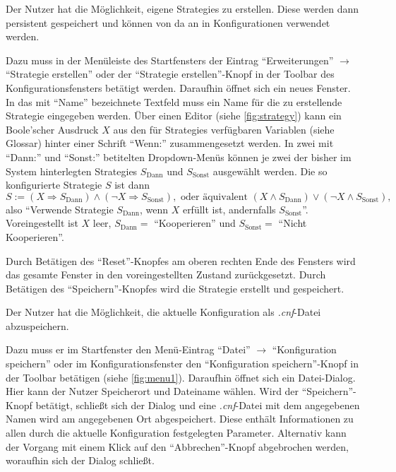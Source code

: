 \documentclass[parskip=full,11pt]{scrartcl}
\begin{document}
Der \Gls{Nutzer} hat die Möglichkeit, eigene \Glspl{Strategie} zu erstellen. Diese werden dann persistent gespeichert und können von da an in Konfigurationen verwendet werden.

Dazu muss in der Menüleiste des Startfensters der Eintrag \enquote{Erweiterungen} \(\rightarrow\) \enquote{\Gls{Strategie} erstellen} oder der \enquote{\Gls{Strategie} erstellen}-Knopf in der Toolbar des Konfigurationsfensters betätigt werden. Daraufhin öffnet sich ein neues Fenster. In das mit \enquote{Name} bezeichnete Textfeld muss ein Name für die zu erstellende \Gls{Strategie} eingegeben werden. Über einen Editor (siehe \cref{fig:strategy}) kann ein Boole'scher Ausdruck \(X\) aus den für \Glspl{Strategie} verfügbaren Variablen (siehe Glossar) hinter einer Schrift \enquote{Wenn:} zusammengesetzt werden. In zwei mit \enquote{Dann:} und \enquote{Sonst:} betitelten Dropdown-Menüs können je zwei der bisher im System hinterlegten \Glspl{Strategie} \(S_\text{Dann}\) und \(S_\text{Sonst}\) ausgewählt werden. Die so konfigurierte \Gls{Strategie} \(S\) ist dann
\[
S := (X \Rightarrow S_\text{Dann}) \land (\lnot X \Rightarrow S_\text{Sonst}), \text{ oder äquivalent } (X \land S_\text{Dann}) \lor (\lnot X \land S_\text{Sonst}),
\]
also \enquote{Verwende \Gls{Strategie} \(S_\text{Dann}\), wenn \(X\) erfüllt ist, andernfalls \(S_\text{Sonst}\)}. Voreingestellt ist \(X\) leer, \(S_\text{Dann} =\) \enquote{Kooperieren} und \(S_\text{Sonst} =\) \enquote{Nicht Kooperieren}.

Durch Betätigen des \enquote{Reset}-Knopfes am oberen rechten Ende des Fensters wird das gesamte Fenster in den voreingestellten Zustand zurückgesetzt. Durch Betätigen des \enquote{Speichern}-Knopfes wird die \Gls{Strategie} erstellt und gespeichert.

Der \Gls{Nutzer} hat die Möglichkeit, die aktuelle Konfiguration als \textit{.cnf}-Datei abzuspeichern.

Dazu muss er im Startfenster den Menü-Eintrag \enquote{Datei} \(\rightarrow\) \enquote{Konfiguration speichern} oder im Konfigurationsfenster den \enquote{Konfiguration speichern}-Knopf in der Toolbar betätigen (siehe \cref{fig:menu1}). Daraufhin öffnet sich ein Datei-Dialog. Hier kann der \Gls{Nutzer} Speicherort und Dateiname wählen. Wird der \enquote{Speichern}-Knopf betätigt, schließt sich der Dialog und eine \textit{.cnf}-Datei mit dem angegebenen Namen wird am angegebenen Ort abgespeichert. Diese enthält Informationen zu allen durch die aktuelle Konfiguration festgelegten Parameter. Alternativ kann der Vorgang mit einem Klick auf den \enquote{Abbrechen}-Knopf abgebrochen werden, woraufhin sich der Dialog schließt.
\end{document}
